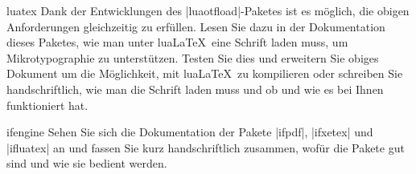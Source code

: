 \documentclass[
	draft,
	blatt=11,
	ausgabe=25.\,06.\,2010,
	rückgabe=02.\,07.\,2010
]{lcourse-hd}
\begin{document}
\begin{expertexercise}[
  name=Typographie auf Anfrage,
  abgabe = Quelltext per Mail{,} das fertige Dokument als Ausdruck.
]{luatex}
Dank der Entwicklungen des |luaotfload|-Paketes ist es möglich, die obigen Anforderungen gleichzeitig zu erfüllen. Lesen Sie dazu in der Dokumentation dieses Paketes, wie man unter lua\LaTeX\ eine Schrift laden muss, um Mikrotypographie zu unterstützen. Testen Sie dies und erweitern Sie obiges Dokument um die Möglichkeit, mit lua\LaTeX\ zu kompilieren oder schreiben Sie handschriftlich, wie man die Schrift laden muss und ob und wie es bei Ihnen funktioniert hat.

\end{expertexercise}

\begin{exercise}[
  name=Maschinenfragen,
  punkte=3,
  abgabe = Handschriftliche Zusammenfassung der Paketdokumentationen.
]{ifengine}
Sehen Sie sich die Dokumentation der Pakete |ifpdf|, |ifxetex| und |ifluatex| an und fassen Sie kurz handschriftlich zusammen, wofür die Pakete gut sind und wie sie bedient werden.
\end{exercise}
\end{document}
